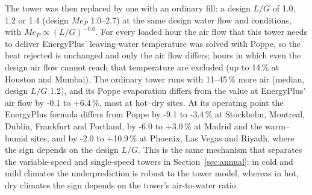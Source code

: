 \documentclass[preprint,12pt]{elsarticle}
\begin{document}
The tower was then replaced by one with an ordinary fill: a design $L/G$ of 1.0, 1.2 or 1.4 (design $Me_P$ 1.0--2.7) at the
same design water flow and conditions, with $Me_P\propto(L/G)^{-0.6}$. For every loaded hour the air flow that this tower
needs to deliver EnergyPlus' leaving-water temperature was solved with Poppe, so the heat rejected is unchanged and only
the air flow differs; hours in which even the design air flow cannot reach that temperature are excluded (up to 14\,\% at
Houston and Mumbai). The ordinary tower runs with 11--45\,\% more air (median, design $L/G$ 1.2), and its Poppe evaporation
differs from the value at EnergyPlus' air flow by -0.1 to +6.4\,\%, most at hot--dry sites. At its operating point the
EnergyPlus formula differs from Poppe by -9.1 to -3.4\,\% at Stockholm, Montreal, Dublin, Frankfurt and Portland, by
-6.0 to +3.0\,\% at Madrid and the warm--humid sites, and by -2.0 to +10.9\,\% at Phoenix, Las Vegas and Riyadh, where the
sign depends on the design $L/G$. This is the same mechanism that separates the variable-speed and single-speed towers in
Section~\ref{sec:annual}: in cold and mild climates the underprediction is robust to the tower model, whereas in hot, dry
climates the sign depends on the tower's air-to-water ratio.
\end{document}

